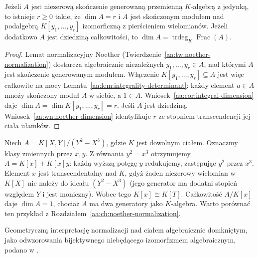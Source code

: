 \begin{wniosek}\label{aa:cor:finite-type-dimension}
Jeżeli $A$ jest niezerową skończenie generowaną przemienną
$K$-algebrą z jedynką, to istnieje $r\ge0$ takie, że
$\dim A=r$ i $A$ jest skończonym modułem nad
podalgebrą $K[y_1,\ldots,y_r]$ izomorficzną z
pierścieniem wielomianów. Jeżeli dodatkowo $A$ jest dziedziną
całkowitości, to
$\dim A=\operatorname{trdeg}_K\operatorname{Frac}(A)$.
\end{wniosek}
\begin{proof}
Lemat normalizacyjny Noether
(Twierdzenie~\ref{aa:tw:noether-normalization}) dostarcza
algebraicznie niezależnych $y_1,\ldots,y_r\in A$,
nad którymi $A$ jest skończenie generowanym modułem.
Włączenie $K[y_1,\ldots,y_r]\subseteq A$ jest więc
całkowite na mocy Lematu~\ref{aa:lem:integrality-determinant}:
każdy element $a\in A$ mnoży skończony moduł $A$ w siebie,
a $1\in A$. Wniosek~\ref{aa:cor:integral-dimension} daje
$\dim A=\dim K[y_1,\ldots,y_r]=r$.
Jeśli $A$ jest dziedziną, Wniosek~\ref{aa:wn:noether-dimension}
identyfikuje $r$ ze stopniem transcendencji jej ciała ułamków.
\end{proof}

\begin{przyklad}\label{aa:prz:integral-cusp}
Niech $A=K[X,Y]/(Y^2-X^3)$, gdzie $K$ jest dowolnym ciałem.
Oznaczmy klasy zmiennych przez $x,y$. Z równania
$y^2=x^3$ otrzymujemy $A=K[x]+K[x]y$:
każdą wyższą potęgę $y$ redukujemy, zastępując $y^2$ przez $x^3$.
Element $x$ jest transcendentalny nad $K$, gdyż żaden
niezerowy wielomian w $K[X]$ nie należy do ideału
$(Y^2-X^3)$ (jego generator ma dodatni stopień względem $Y$
i jest moniczny). Wobec tego $K[x]\cong K[T]$.
Całkowitość $A/K[x]$ daje $\dim A=1$, chociaż $A$ ma dwa
generatory jako $K$-algebra. Warto porównać ten przykład z
Rozdziałem~\ref{aa:ch:noether-normalization}.
\end{przyklad}



Geometryczną interpretację normalizacji nad ciałem algebraicznie domkniętym, jako odwzorowania bijektywnego niebędącego izomorfizmem algebraicznym, podano w .

